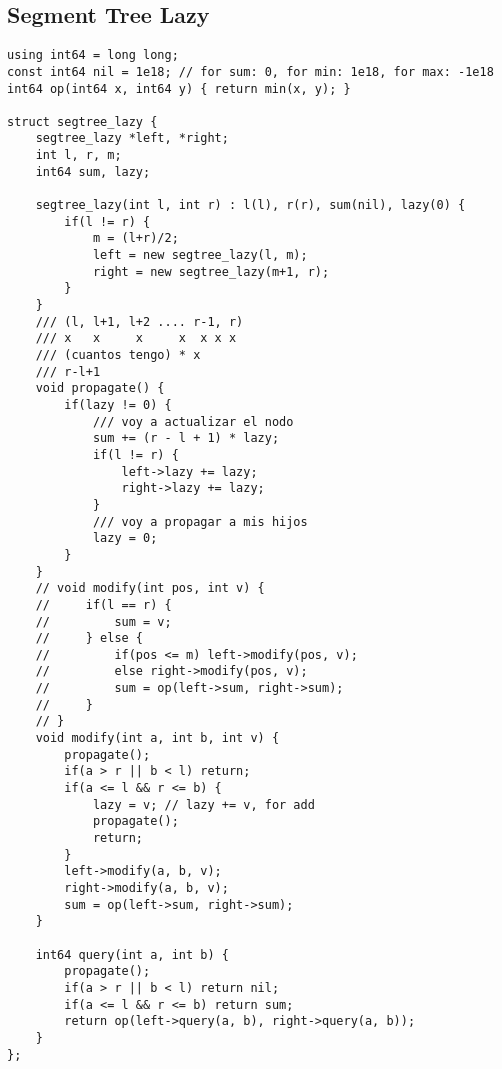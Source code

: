 \documentclass[10pt,letterpaper,twocolumn,twosided]{article}
\begin{document}
\subsection{Segment Tree Lazy}
\begin{lstlisting}
using int64 = long long;
const int64 nil = 1e18; // for sum: 0, for min: 1e18, for max: -1e18
int64 op(int64 x, int64 y) { return min(x, y); }

struct segtree_lazy {
    segtree_lazy *left, *right;
    int l, r, m;
    int64 sum, lazy;

    segtree_lazy(int l, int r) : l(l), r(r), sum(nil), lazy(0) {
        if(l != r) {
            m = (l+r)/2;
            left = new segtree_lazy(l, m);
            right = new segtree_lazy(m+1, r);
        }
    }
    /// (l, l+1, l+2 .... r-1, r)
    /// x   x     x     x  x x x 
    /// (cuantos tengo) * x
    /// r-l+1
    void propagate() {
        if(lazy != 0) {
            /// voy a actualizar el nodo
            sum += (r - l + 1) * lazy;
            if(l != r) {
                left->lazy += lazy;
                right->lazy += lazy;
            }
            /// voy a propagar a mis hijos
            lazy = 0;
        }
    }
    // void modify(int pos, int v) {
    //     if(l == r) {
    //         sum = v;
    //     } else {
    //         if(pos <= m) left->modify(pos, v);
    //         else right->modify(pos, v);
    //         sum = op(left->sum, right->sum);
    //     }
    // }
    void modify(int a, int b, int v) {
        propagate();
        if(a > r || b < l) return;
        if(a <= l && r <= b) {
            lazy = v; // lazy += v, for add
            propagate();
            return;
        }
        left->modify(a, b, v);
        right->modify(a, b, v);
        sum = op(left->sum, right->sum);
    }

    int64 query(int a, int b) {
        propagate();
        if(a > r || b < l) return nil;
        if(a <= l && r <= b) return sum;
        return op(left->query(a, b), right->query(a, b));
    }
};
\end{lstlisting}
\end{document}
